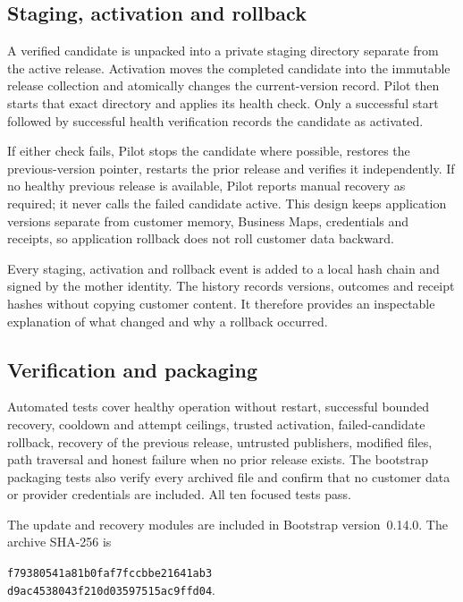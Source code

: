 \subsection{Staging, activation and rollback}

A verified candidate is unpacked into a private staging directory separate from the active release.
Activation moves the completed candidate into the immutable release collection and atomically
changes the current-version record. Pilot then starts that exact directory and applies its health
check. Only a successful start followed by successful health verification records the candidate as
activated.

If either check fails, Pilot stops the candidate where possible, restores the previous-version
pointer, restarts the prior release and verifies it independently. If no healthy previous release is
available, Pilot reports manual recovery as required; it never calls the failed candidate active.
This design keeps application versions separate from customer memory, Business Maps, credentials
and receipts, so application rollback does not roll customer data backward.

Every staging, activation and rollback event is added to a local hash chain and signed by the mother
identity. The history records versions, outcomes and receipt hashes without copying customer
content. It therefore provides an inspectable explanation of what changed and why a rollback
occurred.

\subsection{Verification and packaging}

Automated tests cover healthy operation without restart, successful bounded recovery, cooldown and
attempt ceilings, trusted activation, failed-candidate rollback, recovery of the previous release,
untrusted publishers, modified files, path traversal and honest failure when no prior release exists.
The bootstrap packaging tests also verify every archived file and confirm that no customer data or
provider credentials are included. All ten focused tests pass.

The update and recovery modules are included in Bootstrap version~0.14.0. The archive SHA-256 is
\begin{flushleft}
\texttt{f79380541a81b0fa}\texttt{f7fccbbe21641ab3}\\
\texttt{d9ac4538043f210d}\texttt{03597515ac9ffd04}.
\end{flushleft}

